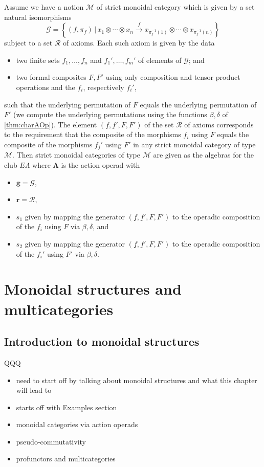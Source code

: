 \documentclass{amsbook} %
\newcommand{\mb}{\mathbf}
\numberwithin{section}{chapter}
\begin{document}
\begin{cor}\label{pres2}
Assume we have a notion $\mathcal{M}$ of strict monoidal category which is given by  a set natural isomorphisms
  \[
    \mathcal{G} = \left\{ (f, \pi_{f}) \, | \,  x_{1} \otimes \cdots \otimes x_{n} \stackrel{f}{\longrightarrow} x_{\pi_{f}^{-1}(1)} \otimes \cdots \otimes x_{\pi_{f}^{-1}(n)} \right\}
  \]
subject to a set $\mathcal{R}$ of axioms.  Each such axiom is given by the data
\begin{itemize}
  \item two finite sets $f_{1}, \ldots, f_{n}$ and $f_{1}', \ldots, f_{m}'$ of elements of $\mathcal{G}$; and
  \item two formal composites $F,F'$ using only composition and tensor product operations and the $f_{i}$, respectively $f_{i}'$, 
\end{itemize}
such that the underlying permutation of $F$ equals the underlying permutation of $F'$ (we compute the underlying permutations using the functions $\beta, \delta$ of \cref{thm:charAOp}).  The element $\left(\underline{f}, \underline{f}', F, F'\right)$ of the set $\mathcal{R}$ of axioms corresponds to the requirement that the composite of the morphisms $f_{i}$ using $F$ equals the composite of the morphisms $f_{j}'$ using $F'$ in any strict monoidal category of type $\mathcal{M}$.  Then strict monoidal categories of type $\mathcal{M}$ are given as the algebras for the club $E\Lambda$ where $\mb{\Lambda}$ is the action operad with
\begin{itemize}
  \item $\mathbf{g} = \mathcal{G}$,
  \item $\mathbf{r} = \mathcal{R}$,
  \item $s_{1}$ given by mapping the generator $\left(\underline{f}, \underline{f}', F, F'\right)$ to the operadic composition of the $f_{i}$ using $F$ via $\beta, \delta$, and
  \item $s_{2}$ given by mapping the generator $\left(\underline{f}, \underline{f}', F, F'\right)$ to the operadic composition of the $f_{i}'$ using $F'$ via $\beta, \delta$.
\end{itemize}
\end{cor}

\chapter{Monoidal structures and multicategories}
 \section{Introduction to monoidal structures}
QQQ
	\begin{itemize}
		\item need to start off by talking about monoidal structures and what this chapter will lead to
		\item starts off with Examples section
		\item monoidal categories via action operads
		\item pseudo-commutativity
		\item profunctors and multicategories
	\end{itemize}
\end{document}
